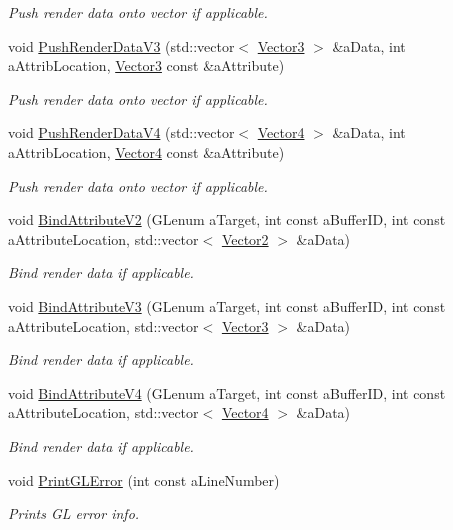 \begin{DoxyCompactItemize}
\begin{DoxyCompactList}\small\item\em Push render data onto vector if applicable. \end{DoxyCompactList}\item 
void \hyperlink{classPCShaderScreen_aa23f04df99385a9872993f790a585bf3}{Push\+Render\+Data\+V3} (std\+::vector$<$ \hyperlink{structVector3}{Vector3} $>$ \&a\+Data, int a\+Attrib\+Location, \hyperlink{structVector3}{Vector3} const \&a\+Attribute)
\begin{DoxyCompactList}\small\item\em Push render data onto vector if applicable. \end{DoxyCompactList}\item 
void \hyperlink{classPCShaderScreen_a6f5bc2d7e28d2fe56891672d3863963d}{Push\+Render\+Data\+V4} (std\+::vector$<$ \hyperlink{structVector4}{Vector4} $>$ \&a\+Data, int a\+Attrib\+Location, \hyperlink{structVector4}{Vector4} const \&a\+Attribute)
\begin{DoxyCompactList}\small\item\em Push render data onto vector if applicable. \end{DoxyCompactList}\item 
void \hyperlink{classPCShaderScreen_ad04e129dc52b0f9fcddc26ef3c6b32d7}{Bind\+Attribute\+V2} (G\+Lenum a\+Target, int const a\+Buffer\+ID, int const a\+Attribute\+Location, std\+::vector$<$ \hyperlink{structVector2}{Vector2} $>$ \&a\+Data)
\begin{DoxyCompactList}\small\item\em Bind render data if applicable. \end{DoxyCompactList}\item 
void \hyperlink{classPCShaderScreen_ab761c013600361fc2c5cc503826d3946}{Bind\+Attribute\+V3} (G\+Lenum a\+Target, int const a\+Buffer\+ID, int const a\+Attribute\+Location, std\+::vector$<$ \hyperlink{structVector3}{Vector3} $>$ \&a\+Data)
\begin{DoxyCompactList}\small\item\em Bind render data if applicable. \end{DoxyCompactList}\item 
void \hyperlink{classPCShaderScreen_a87cc5e3d194128d691adbc4306efb986}{Bind\+Attribute\+V4} (G\+Lenum a\+Target, int const a\+Buffer\+ID, int const a\+Attribute\+Location, std\+::vector$<$ \hyperlink{structVector4}{Vector4} $>$ \&a\+Data)
\begin{DoxyCompactList}\small\item\em Bind render data if applicable. \end{DoxyCompactList}\item 
void \hyperlink{classPCShaderScreen_a61dd7766256d89a02749af86ef92f284}{Print\+G\+L\+Error} (int const a\+Line\+Number)
\begin{DoxyCompactList}\small\item\em Prints GL error info. \end{DoxyCompactList}\end{DoxyCompactItemize}
